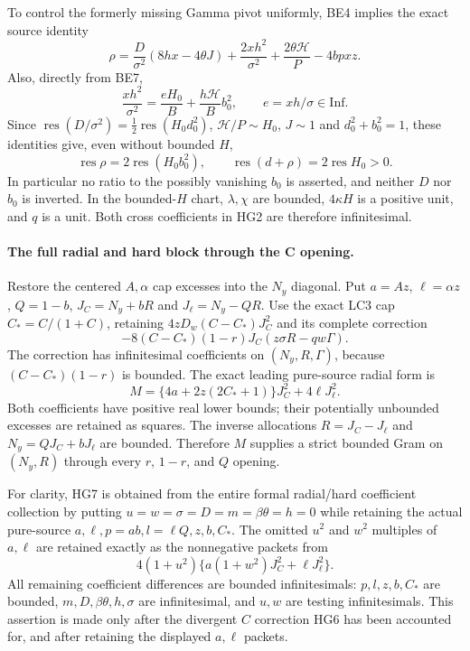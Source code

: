 To control the formerly missing Gamma pivot uniformly, BE4 implies
the exact source identity
\[
 \rho=\frac D{\sigma^2}(8hx-4\theta J)
       +\frac{2xh^2}{\sigma^2}
       +\frac{2\theta\mathcal H}{P}-4bp xz.
 \tag{HG3}
\]
Also, directly from BE7,
\[
 \frac{xh^2}{\sigma^2}
    =\frac{eH_0}{B}+\frac{h\mathcal H}{B}b_0^2,
 \qquad e=xh/\sigma\in\mathrm{Inf}.
 \tag{HG4}
\]
Since $\operatorname{res}(D/\sigma^2)=
\tfrac12\operatorname{res}(H_0d_0^2)$,
$\mathcal H/P\sim H_0$, $J\sim1$ and
$d_0^2+b_0^2=1$, these identities give, even without bounded $H$,
\[
 \operatorname{res}\rho=2\operatorname{res}(H_0b_0^2),\qquad
 \operatorname{res}(d+\rho)=2\operatorname{res}H_0>0.
 \tag{HG5}
\]
In particular no ratio to the possibly vanishing $b_0$ is asserted,
and neither $D$ nor $b_0$ is inverted.  In the bounded-$H$ chart,
$\lambda,\chi$ are bounded,
$4\kappa H$ is a positive unit, and $q$ is a unit.  Both cross
coefficients in HG2 are therefore infinitesimal.

\paragraph{The full radial and hard block through the C opening.}
Restore the centered $A,\alpha$ cap excesses into the $N_y$ diagonal.
Put $a=Az$, $\ell=\alpha z$, $Q=1-b$,
$J_C=N_y+bR$ and $J_\ell=N_y-QR$.
Use the exact LC3 cap $C_*=C/(1+C)$, retaining
$4zD_w(C-C_*)J_C^2$ and its complete correction
\[
 -8(C-C_*)(1-r)J_C(z\sigma R-qw\Gamma).
 \tag{HG6}
\]
The correction has infinitesimal coefficients on
$(N_y,R,\Gamma)$, because $(C-C_*)(1-r)$ is bounded.
The exact leading pure-source radial form is
\[
 M=\{4a+2z(2C_*+1)\}J_C^2+4\ell J_\ell^2.
 \tag{HG7}
\]
Both coefficients have positive real lower bounds; their potentially
unbounded excesses are retained as squares.  The inverse allocations
$R=J_C-J_\ell$ and $N_y=QJ_C+bJ_\ell$ are bounded.  Therefore
$M$ supplies a strict bounded Gram on $(N_y,R)$ through every
$r$, $1-r$, and $Q$ opening.

For clarity, HG7 is obtained from the entire formal radial/hard
coefficient collection by putting $u=w=\sigma=D=m=\beta\theta=h=0$
while retaining the actual pure-source $a,\ell,p=ab,l=\ell Q,z,b,C_*$.
The omitted $u^2$ and $w^2$ multiples of $a,\ell$ are retained
exactly as the nonnegative packets from
\[
 4(1+u^2)\{a(1+w^2)J_C^2+\ell J_\ell^2\}.
\]
All remaining coefficient differences are bounded infinitesimals:
$p,l,z,b,C_*$ are bounded, $m,D,\beta\theta,h,\sigma$ are
infinitesimal, and $u,w$ are testing infinitesimals.  This assertion
is made only after the divergent $C$ correction HG6 has been
accounted for, and after retaining the displayed $a,\ell$ packets.

